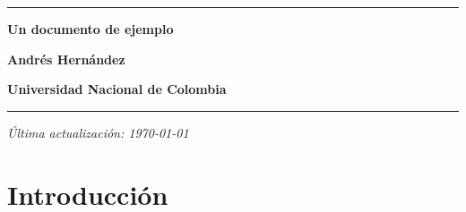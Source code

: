 \documentclass{article}
\begin{document}
\begin{titlepage}
  \centering

  \vfill %

  \rule{\textwidth}{1pt} %

  \vspace{0.5cm} %

  \textbf{\Huge Un documento de ejemplo} %

  \bigskip %

  \textbf{\Large Andrés Hernández} %

  \medskip %

  \textbf{\large Universidad Nacional de Colombia} %

  \rule{\textwidth}{1pt} %

  \vspace{0.5cm} %

  \vfill %


  \textit{Última actualización: \today}

\end{titlepage}

\section*{Introducción}
\end{document}
